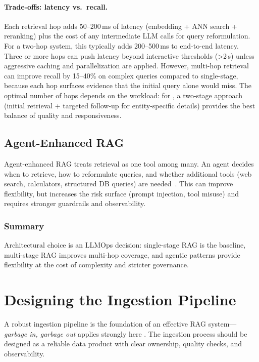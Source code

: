 \paragraph{Trade-offs: latency vs.\ recall.}
Each retrieval hop adds 50--200\,ms of latency (embedding + ANN search + reranking) plus the cost of any intermediate LLM calls for query reformulation. For a two-hop system, this typically adds 200--500\,ms to end-to-end latency. Three or more hops can push latency beyond interactive thresholds (>2\,s) unless aggressive caching and parallelization are applied. However, multi-hop retrieval can improve recall by 15--40\% on complex queries compared to single-stage, because each hop surfaces evidence that the initial query alone would miss. The optimal number of hops depends on the workload: for \ishtar{}, a two-stage approach (initial retrieval + targeted follow-up for entity-specific details) provides the best balance of quality and responsiveness.


\subsection{Agent-Enhanced RAG}
Agent-enhanced RAG treats retrieval as one tool among many. An agent decides when to retrieve, how to reformulate queries, and whether additional tools (web search, calculators, structured DB queries) are needed~\cite{Yao2022ReAct,Schick2023Toolformer}. This can improve flexibility, but increases the risk surface (prompt injection, tool misuse) and requires stronger guardrails and observability.

\subsubsection*{Summary}
Architectural choice is an LLMOps decision: single-stage RAG is the baseline, multi-stage RAG improves multi-hop coverage, and agentic patterns provide flexibility at the cost of complexity and stricter governance.

\FloatBarrier
\section{Designing the Ingestion Pipeline}
\label{sec:rag-designing-the-ingestion-pipeline}
A robust ingestion pipeline is the foundation of an effective RAG system—\emph{garbage in, garbage out} applies strongly here \cite{Pryon2023}. The ingestion process should be designed as a reliable data product with clear ownership, quality checks, and observability.

